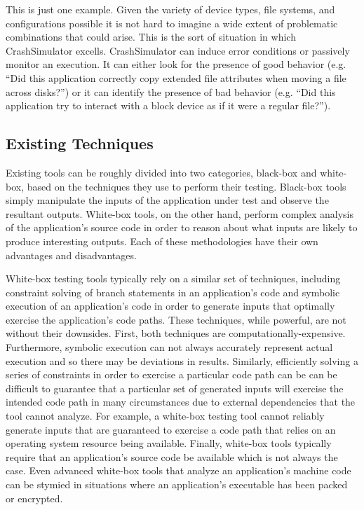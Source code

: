     This is just one example.  Given the variety of device types, file systems, and configurations possible it is not
    hard to imagine a wide extent of problematic combinations that could arise.  This is the sort of situation in which
    CrashSimulator excells.  CrashSimulator can induce error conditions or passively monitor an execution.  It can
    either look for the presence of good behavior (e.g. ``Did this application correctly copy extended file attributes
    when moving a file across disks?'') or it can identify the presence of bad behavior (e.g. ``Did this application try to
    interact with a block device as if it were a regular file?'').  
    
    \subsection{Existing Techniques}

    Existing tools can be roughly divided into two categories, black-box and white-box, based on the techniques they
    use to perform their testing. Black-box tools simply manipulate the inputs of the application under test and
    observe the resultant outputs. White-box tools, on the other hand, perform complex analysis of the application's
    source code in order to reason about what inputs are likely to produce interesting outputs. Each of these
    methodologies have their own advantages and disadvantages.

    White-box testing tools typically rely on a similar set of techniques, including constraint solving of branch
    statements in an application's code and symbolic execution of an application's code in order to generate inputs
    that optimally exercise the application's code paths. These techniques, while powerful, are not without their
    downsides. First, both techniques are computationally-expensive. Furthermore, symbolic execution can not always
    accurately represent actual execution and so there may be deviations in results. Similarly, efficiently solving
    a series of constraints in order to exercise a particular code path can be can be difficult to guarantee that a
    particular set of generated inputs will exercise the intended code path in many circumstances due to external
    dependencies that the tool cannot analyze. For example, a white-box testing tool cannot reliably generate inputs
    that are guaranteed to exercise a code path that relies on an operating system resource being available.
    Finally, white-box tools typically require that an application's source code be available which is not always
    the case. Even advanced white-box tools that analyze an application's machine code can be stymied in situations
    where an application's executable has been packed or encrypted.

